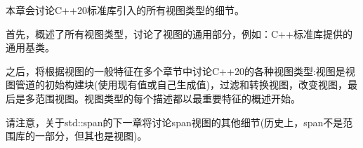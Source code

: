 本章会讨论C++20标准库引入的所有视图类型的细节。

首先，概述了所有视图类型，讨论了视图的通用部分，例如：C++标准库提供的通用基类。

之后，将根据视图的一般特征在多个章节中讨论C++20的各种视图类型:视图是视图管道的初始构建块(使用现有值或自己生成值)，过滤和转换视图，改变视图，最后是多范围视图。视图类型的每个描述都以最重要特征的概述开始。

请注意，关于std::span的下一章将讨论span视图的其他细节(历史上，span不是范围库的一部分，但其也是视图)。
